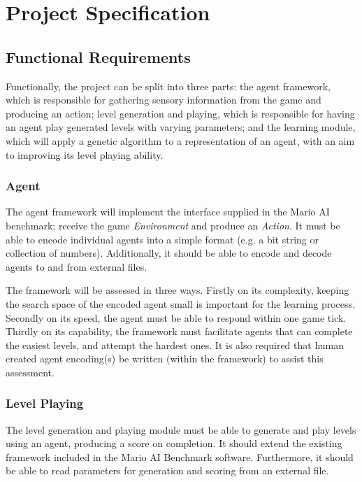 
\section{Project Specification}


\subsection{Functional Requirements}
Functionally, the project can be split into three parts: the agent framework, which is responsible for gathering sensory information from the game and producing an action; level generation and playing, which is responsible for having an agent play generated levels with varying parameters; and the learning module, which will apply a genetic algorithm to a representation of an agent, with an aim to improving its level playing ability. 

\subsubsection{Agent}
The agent framework will implement the interface supplied in the Mario AI benchmark; receive the game \emph{Environment} and produce an \emph{Action}. It must be able to encode individual agents into a simple format (e.g. a bit string or collection of numbers). Additionally, it should be able to encode and decode agents to and from external files. 

The framework will be assessed in three ways. Firstly on its complexity, keeping the search space of the encoded agent small is important for the learning process. Secondly on its speed, the agent must be able to respond within one game tick. Thirdly on its capability, the framework must facilitate agents that can complete the easiest levels, and attempt the hardest ones. It is also required that human created agent encoding(s) be written (within the framework) to assist this assessment.

\subsubsection{Level Playing}
The level generation and playing module must be able to generate and play levels using an agent, producing a score on completion. It should extend the existing framework included in the Mario AI Benchmark software. Furthermore, it should be able to read parameters for generation and scoring from an external file.

